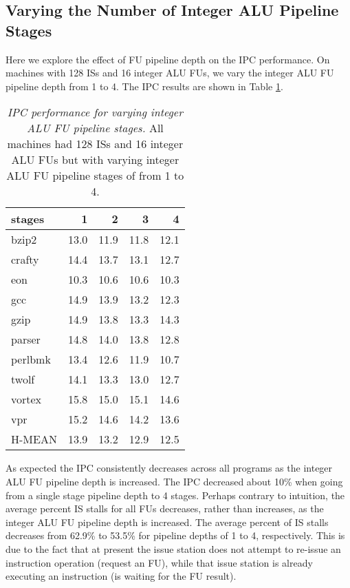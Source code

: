 \documentclass[10pt,dvips]{article}
\begin{document}
\subsection{Varying the Number of Integer ALU Pipeline Stages}
%
Here we explore the effect of FU pipeline depth on the IPC
performance.
On machines with 128 ISs and 16 integer ALU FUs,
we vary the integer ALU FU pipeline depth from 1 to 4.
The IPC results are shown in Table \ref{tab:lialu16ipc}.
%
\begin{table}[p]
\begin{center}
\caption{{\em IPC performance for varying integer ALU FU pipeline stages.}
All machines had 128 ISs and 16 integer ALU FUs but with varying 
integer ALU FU pipeline stages of from 1 to 4.}
\label{tab:lialu16ipc}
\vspace{+0.1in}
\begin{tabular}{|l||r|r|r|r|}
\hline 
{stages}& 1 & 2 & 3 & 4 \\
\hline

\hline
bzip2&
13.0 & 11.9 & 11.8 & 12.1 \\

\hline
crafty&
14.4 & 13.7 & 13.1 & 12.7 \\

\hline
eon&
10.3 & 10.6 & 10.6 & 10.3 \\

\hline
gcc&
14.9 & 13.9 & 13.2 & 12.3 \\

\hline
gzip&
14.9 & 13.8 & 13.3 & 14.3 \\

\hline
parser&
14.8 & 14.0 & 13.8 & 12.8 \\

\hline
perlbmk&
13.4 & 12.6 & 11.9 & 10.7 \\

\hline
twolf&
14.1 & 13.3 & 13.0 & 12.7 \\

\hline
vortex&
15.8 & 15.0 & 15.1 & 14.6 \\

\hline
vpr&
15.2 & 14.6 & 14.2 & 13.6 \\

\hline
H-MEAN&
13.9 & 13.2 & 12.9 & 12.5 \\

\hline
\end{tabular}
\end{center}
\end{table}
%
%
As expected the IPC consistently decreases across all programs
as the integer ALU FU pipeline depth is increased.
The IPC decreased about 10\% when going from a single stage
pipeline depth to 4 stages.
Perhaps contrary to intuition, the average percent
IS stalls for all FUs decreases, rather than increases,
as the integer ALU FU pipeline depth is increased.
The average percent of IS stalls decreases from 62.9\% to 53.5\%
for pipeline depths of 1 to 4, respectively.
This is due to the fact that at present the issue station does not 
attempt to re-issue an instruction operation
(request an FU), while that issue station is already executing 
an instruction (is waiting for the FU result).
%
%
\end{document}
